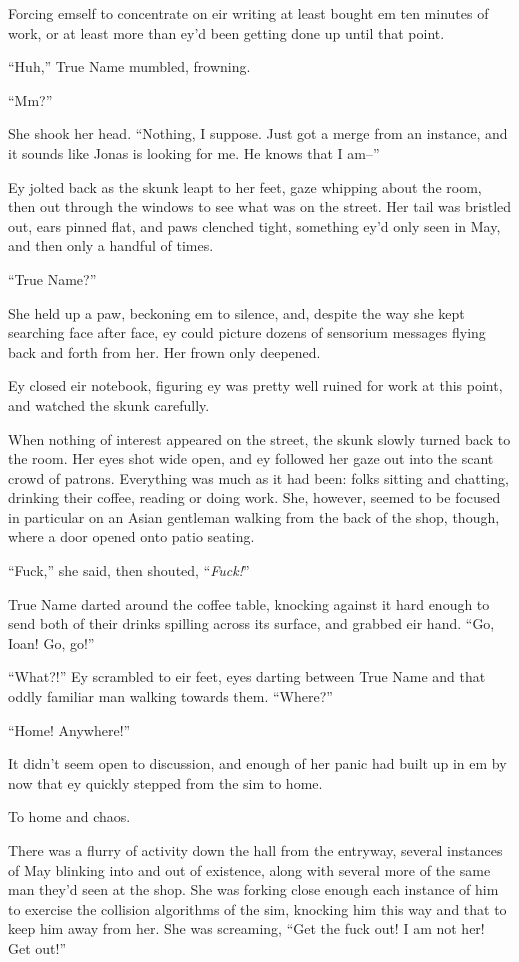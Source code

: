 Forcing emself to concentrate on eir writing at least bought em ten minutes of work, or at least more than ey'd been getting done up until that point.

``Huh,'' True Name mumbled, frowning.

``Mm?''

She shook her head. ``Nothing, I suppose. Just got a merge from an instance, and it sounds like Jonas is looking for me. He knows that I am--''

Ey jolted back as the skunk leapt to her feet, gaze whipping about the room, then out through the windows to see what was on the street. Her tail was bristled out, ears pinned flat, and paws clenched tight, something ey'd only seen in May, and then only a handful of times.

``True Name?''

She held up a paw, beckoning em to silence, and, despite the way she kept searching face after face, ey could picture dozens of sensorium messages flying back and forth from her. Her frown only deepened.

Ey closed eir notebook, figuring ey was pretty well ruined for work at this point, and watched the skunk carefully.

When nothing of interest appeared on the street, the skunk slowly turned back to the room. Her eyes shot wide open, and ey followed her gaze out into the scant crowd of patrons. Everything was much as it had been: folks sitting and chatting, drinking their coffee, reading or doing work. She, however, seemed to be focused in particular on an Asian gentleman walking from the back of the shop, though, where a door opened onto patio seating.

``Fuck,'' she said, then shouted, ``\emph{Fuck!}''

True Name darted around the coffee table, knocking against it hard enough to send both of their drinks spilling across its surface, and grabbed eir hand. ``Go, Ioan! Go, go!''

``What?!'' Ey scrambled to eir feet, eyes darting between True Name and that oddly familiar man walking towards them. ``Where?''

``Home! Anywhere!''

It didn't seem open to discussion, and enough of her panic had built up in em by now that ey quickly stepped from the sim to home.

To home and chaos.

There was a flurry of activity down the hall from the entryway, several instances of May blinking into and out of existence, along with several more of the same man they'd seen at the shop. She was forking close enough each instance of him to exercise the collision algorithms of the sim, knocking him this way and that to keep him away from her. She was screaming, ``Get the fuck out! I am not her! Get out!''

